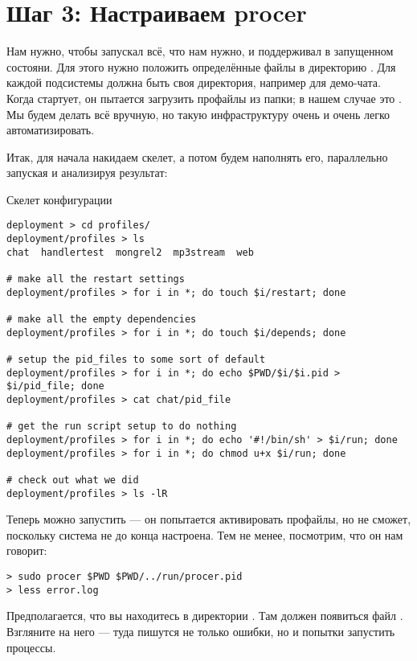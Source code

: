 \section{Шаг 3: Настраиваем procer}

Нам нужно, чтобы  запускал всё, что нам нужно, и поддерживал в
запущенном состояни. Для этого нужно положить определённые файлы в директорию
. Для каждой подсистемы должна быть своя директория, например
 для демо-чата. Когда  стартует, он пытается загрузить
профайлы из папки; в нашем случае это . Мы будем делать всё
вручную, но такую инфраструктуру очень и очень легко автоматизировать.

Итак, для начала накидаем скелет, а потом будем наполнять его, параллельно
запуская  и анализируя результат:

\begin{code}{Скелет конфигурации}
\begin{lstlisting}
deployment > cd profiles/
deployment/profiles > ls
chat  handlertest  mongrel2  mp3stream  web

# make all the restart settings
deployment/profiles > for i in *; do touch $i/restart; done

# make all the empty dependencies
deployment/profiles > for i in *; do touch $i/depends; done

# setup the pid_files to some sort of default
deployment/profiles > for i in *; do echo $PWD/$i/$i.pid > $i/pid_file; done
deployment/profiles > cat chat/pid_file

# get the run script setup to do nothing
deployment/profiles > for i in *; do echo '#!/bin/sh' > $i/run; done
deployment/profiles > for i in *; do chmod u+x $i/run; done

# check out what we did
deployment/profiles > ls -lR
\end{lstlisting}
\end{code}

Теперь можно запустить  --- он попытается активировать профайлы,
но не сможет, поскольку система не до конца настроена. Тем не менее, посмотрим,
что он нам говорит: 

\begin{lstlisting}
> sudo procer $PWD $PWD/../run/procer.pid
> less error.log
\end{lstlisting}

Предполагается, что вы находитесь в директории . Там должен
появиться файл . Взгляните на него --- туда пишутся не только
ошибки, но и попытки запустить процессы. 

